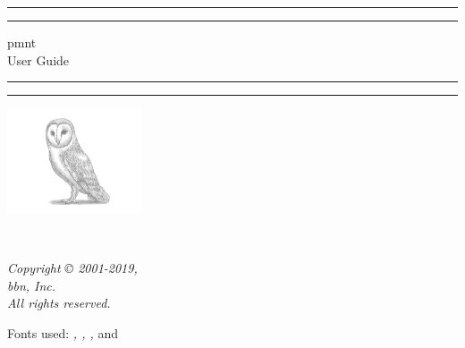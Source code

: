 
\begin{titlepage}
	\centering

	\vspace*{\baselineskip}

	\rule{\textwidth}{1.6pt}\vspace*{-\baselineskip}\vspace*{2pt}
	\rule{\textwidth}{0.4pt}

	\vspace{0.75\baselineskip}

	{\LARGE\acl{pmnt}\\User Guide\\}

	\vspace{0.75\baselineskip}

	\rule{\textwidth}{0.4pt}\vspace*{-\baselineskip}\vspace{3.2pt}
	\rule{\textwidth}{1.6pt}

	\vspace{2\baselineskip}

	\includegraphics[width=0.3\textwidth]{BarnOwl.jpeg}

	\vspace*{4\baselineskip}

	{\Large\theauthor\\}

	\vspace{0.5\baselineskip}

	\textit{\thedate}

	\vfill

	\textit{Copyright © 2001-2019,\\
	\acl{bbn}, Inc.\\
	All rights reserved.}

	{\small Fonts used:  \emph{\mainfont, \sansfont, \monofont,} and \emph{\mathfont}}
\end{titlepage}
\tableofcontents
\listoffigures
\listoftables
